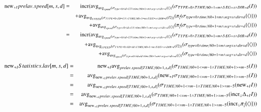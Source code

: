 %
\begin{eqnarray*}
\algnew_{+I} prelav.speed[m,s,d] 
&=& \algincr ( \algavg_{\algavg_{speed}(\sigma_ {type=0 \wedge id = I.V \wedge time/60 +1 = m \wedge seg = s \wedge dir = d } \{\tuple{}\}} ( \sigma_ {TYPE=0 \wedge TIME/60 +1 = m \wedge SEG = s \wedge DIR = d } (I) ) \\
&& + \algavg_{\algavg_{SPEED} (\sigma_ {TYPE=0 \wedge ID = I.V \wedge TIME/60 +1 = m \wedge SEG = s \wedge DIR = d } (I2))} (\pi_{\vec{i}} (\sigma_ {type=0 \wedge time/60 +1 = m \wedge seg = s \wedge dir = d } \{\tuple{}\}) )\\
&& + \algavg_{\algavg_{speed}(\sigma_ {type=0 \wedge id = I.V \wedge time/60 +1 = m \wedge seg = s \wedge dir = d } \{\tuple{}\}} (\pi_{\vec{i}} (\sigma_ {type=0 \wedge time/60 +1 = m \wedge seg = s \wedge dir = d } \{\tuple{}\}) )\\
%
&=& \algincr ( \algavg_{\algavg_{speed}(\sigma_ {type=0 \wedge id = I.V \wedge time/60 +1 = m \wedge seg = s \wedge dir = d } \{\tuple{}\}} ( \sigma_ {TYPE=0 \wedge TIME/60 +1 = m \wedge SEG = s \wedge DIR = d } (I) ) \\
&& + \algavg_{\algavg_{SPEED} (\sigma_ {TYPE=0 \wedge ID = id \wedge TIME/60 +1 = m \wedge SEG = s \wedge DIR = d } (I2))}  (\sigma_ {type=0 \wedge time/60 +1 = m \wedge seg = s \wedge dir = d } \{\tuple{}\})\\
&& + \algavg_{\algavg_{speed}(\sigma_ {type=0 \wedge id = id \wedge time/60 +1 = m \wedge seg = s \wedge dir = d } \{\tuple{}\}} (\sigma_ {type=0 \wedge time/60 +1 = m \wedge seg = s \wedge dir = d } \{\tuple{}\}) 
\end{eqnarray*}
\begin{eqnarray*}
\mathrm{new}_{+I} Statistics.lav[m,s,d] 
&=& \mathrm{new}_{+I} \mathrm{avg}_{prelav.speed[TIME/60+1,s,d]} (\sigma_{TIME/60+1 <= m-1 \wedge TIME/60+1 >= m-5} (I))\\
&=& \mathrm{avg}_{\mathrm{new}_{+I} prelav.speed[TIME/60+1,s,d]} (\mathrm{new}_{+I} \sigma_{TIME/60+1 <= m-1 \wedge TIME/60+1 >= m-5} (I))\\
&=& \mathrm{avg}_{\mathrm{new}_{+I} prelav.speed[TIME/60+1,s,d]} (\sigma_{TIME/60+1<=m-1 \wedge TIME/60+1 >= m-5} (\mathrm{new}_{+I} I)) \\
&=& \mathrm{avg}_{\mathrm{new}_{+I} prelav.speed[TIME/60+1,s,d]} (\sigma_{TIME/60+1<=m-1 \wedge TIME/60+1 >= m-5} (\mathrm{incr}_{\cup} \Delta_{+I}I))\\
&=& \mathrm{avg}_{\mathrm{new}_{+I} prelav.speed[TIME/60+1,s,d]} (\sigma_{TIME/60+1<=m-1 \wedge TIME/60+1 >= m-5} (\mathrm{incr}_{\cup} \pi_{\vec{i}} \{{\langle\rangle}\}))
\end{eqnarray*}
